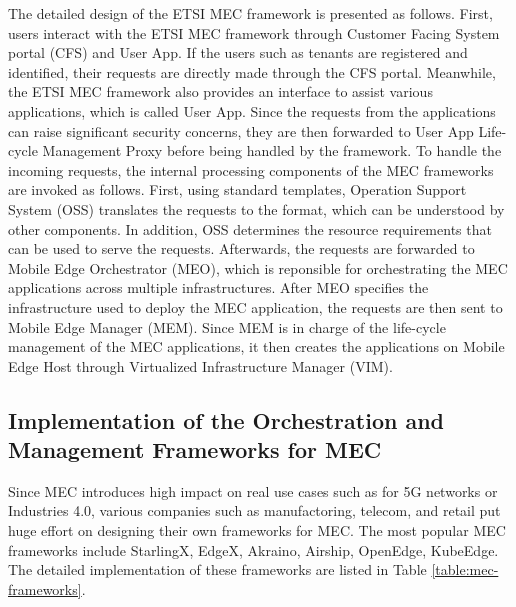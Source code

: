 The detailed design of the ETSI MEC framework is presented as follows. 
First, users interact with the ETSI MEC framework through Customer Facing System portal (CFS) and User App. If the users such as tenants are registered and identified, their requests are directly made through the CFS portal. Meanwhile, the ETSI MEC framework also provides an interface to assist various applications, which is called User App. Since the requests from the applications can raise significant security concerns, they are then forwarded to User App Life-cycle Management Proxy before being handled by the framework. To handle the incoming requests, the internal processing components of the MEC frameworks are invoked as follows. First, using standard templates, Operation Support System (OSS) translates the requests to the format, which can be understood by other components. In addition, OSS determines the resource requirements that can be used to serve the requests. Afterwards, the requests are forwarded to Mobile Edge Orchestrator (MEO), which is reponsible for orchestrating the MEC applications across multiple infrastructures. After MEO specifies the infrastructure used to deploy the MEC application, the requests are then sent to Mobile Edge Manager (MEM). Since MEM is in charge of the life-cycle management of the MEC applications, it then creates the applications on Mobile Edge Host through Virtualized Infrastructure Manager (VIM).   


\subsection{Implementation of the Orchestration and Management Frameworks for MEC}

Since MEC introduces high impact on real use cases such as for 5G networks or Industries 4.0, various companies such as manufactoring, telecom, and retail put huge effort on designing their own frameworks for MEC. The most popular MEC frameworks include StarlingX, EdgeX, Akraino, Airship, OpenEdge, KubeEdge. The detailed implementation of these frameworks are listed in Table \ref{table:mec-frameworks}.

